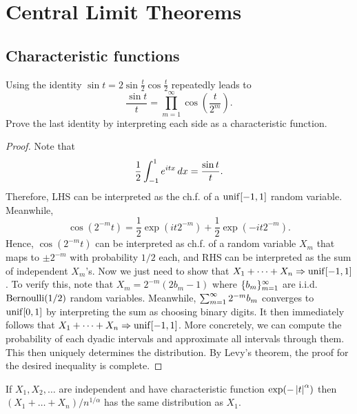 \documentclass[a4paper]{article}
\newcommand{\convd}{\Rightarrow}
\begin{document}
\section{Central Limit Theorems}

\setcounter{subsection}{2}

\subsection{Characteristic functions}

\begin{ex}[Durrett 3.3.10]
  Using the identity $\sin t = 2 \sin \frac{t}{2} \cos \frac{t}{2}$
  repeatedly leads to
  \[
    \frac{\sin t}{t} = \prod_{m=1}^\infty \cos \left( \frac{t}{2^m} \right).
  \]
  Prove the last identity by interpreting each
  side as a characteristic function.
\end{ex}

\begin{proof}
  Note that
  \[
    \frac{1}{2} \int_{-1}^1 e^{i t x} \, d x = \frac{\sin t}{t}.
  \]
  Therefore, LHS can be interpreted as the ch.f. of a
  $\operatorname{unif} [-1, 1]$ random variable. Meanwhile,
  \[
    \cos \left( 2^{-m} t \right) = \frac{1}{2} \exp (i t 2^{-m})
    + \frac{1}{2} \exp (- i t 2^{-m}).
  \]
  Hence, $\cos (2^{-m} t)$ can be interpreted as ch.f. of a random variable
  $X_m$ that maps to $\pm 2^{-m}$ with probability $1/2$ each,
  and RHS can be interpreted as the sum of independent $X_m$'s.
  Now we just need to show that $X_1 + \dots + X_n \convd \unif[-1, 1]$.
  To verify this, note that $X_m = 2^{-m} (2 b_m - 1)$ where
  $\{ b_m \}_{m=1}^\infty$ are i.i.d.\ $\operatorname{Bernoulli} (1 / 2)$ random
  variables. Meanwhile, $\sum_{m=1}^\infty 2^{-m} b_m$ converges to
  $\operatorname{unif}[0, 1]$ by interpreting the sum as choosing binary digits.
  It then immediately follows that $X_1 + \dots + X_n \convd \unif [-1, 1]$.
  More concretely, we can compute the probability of each dyadic intervals
  and approximate all intervals through them. This then uniquely determines
  the distribution.
  By Levy's theorem, the proof for the desired inequality is complete.

\end{proof}

\begin{ex}[Durrett 3.3.20]
  If $X_1, X_2, \dots$ are independent and have characteristic
  function $\exp (- \left\lvert t\right\rvert^\alpha)$ then
  $(X_1 + \dots + X_n) / n^{1 / \alpha}$ has the same distribution
  as $X_1$.
\end{ex}
\end{document}
